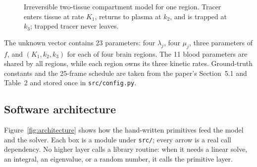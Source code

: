 \documentclass[sigconf,nonacm]{acmart}
\begin{document}
\begin{figure}[t]
  \centering
  \caption{Irreversible two-tissue compartment model for one region. Tracer enters tissue at rate $K_1$, returns to plasma at $k_2$, and is trapped at $k_3$; trapped tracer never leaves.}
  \label{fig:compartment}
\end{figure}

The unknown vector contains 23 parameters: four $\lambda_j$, four $\mu_j$, three parameters of $f$, and $(K_1,k_2,k_3)$ for each of four brain regions. The 11 blood parameters are shared by all regions, while each region owns its three kinetic rates. Ground-truth constants and the 25-frame schedule are taken from the paper's Section~5.1 and Table~2 and stored once in \texttt{src/config.py}.

\subsection{Software architecture}

Figure~\ref{fig:architecture} shows how the hand-written primitives feed the model and the solver. Each box is a module under \texttt{src/}; every arrow is a real call dependency. No higher layer calls a library routine: when it needs a linear solve, an integral, an eigenvalue, or a random number, it calls the primitive layer.
\end{document}
